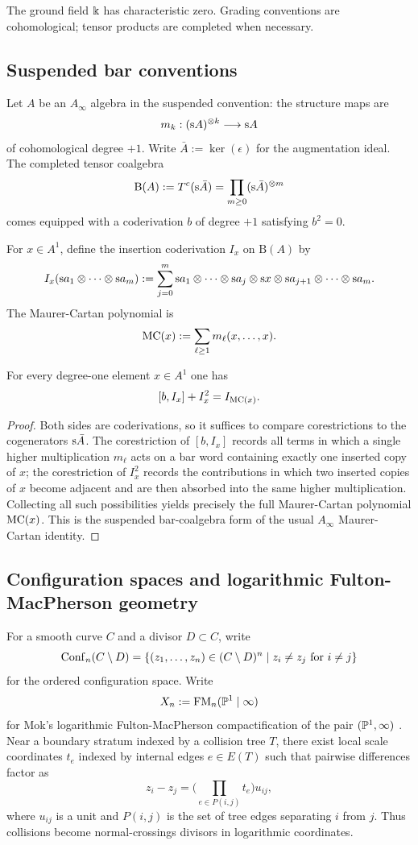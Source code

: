 The ground field $\Bbbk$ has characteristic zero. Grading conventions are cohomological; tensor products are completed when necessary.

\subsection{Suspended bar conventions}
Let $A$ be an $A_\infty$ algebra in the suspended convention: the structure maps are
\[
 m_k : (\mathrm s A)^{\otimes k} \longrightarrow \mathrm s A
\]
of cohomological degree $+1$. Write $\bar{A}:=\ker(\epsilon)$ for the augmentation ideal. The completed tensor coalgebra
\[
 \mathrm B(A):=T^c(\mathrm s \bar{A})=\prod_{m\ge 0}(\mathrm s \bar{A})^{\otimes m}
\]
comes equipped with a coderivation $b$ of degree $+1$ satisfying $b^2=0$.

For $x\in A^1$, define the insertion coderivation $I_x$ on $\mathrm B(A)$ by
\[
 I_x(\mathrm s a_1\otimes\cdots\otimes \mathrm s a_m)
 :=
 \sum_{j=0}^{m}
 \mathrm s a_1\otimes\cdots\otimes\mathrm s a_j\otimes\mathrm s x\otimes\mathrm s a_{j+1}\otimes\cdots\otimes\mathrm s a_m.
\]
The Maurer-Cartan polynomial is
\[
 \mathrm{MC}(x):=\sum_{\ell\ge 1} m_\ell(x,\dots,x).
\]

\begin{lemma}\label{lem:bar-insertion}
For every degree-one element $x\in A^1$ one has
\[
 [b,I_x]+I_x^2 = I_{\mathrm{MC}(x)}.
\]
\end{lemma}

\begin{proof}
Both sides are coderivations, so it suffices to compare corestrictions to the cogenerators $\mathrm s \bar{A}$. The corestriction of $[b,I_x]$ records all terms in which a single higher multiplication $m_\ell$ acts on a bar word containing exactly one inserted copy of $x$; the corestriction of $I_x^2$ records the contributions in which two inserted copies of $x$ become adjacent and are then absorbed into the same higher multiplication. Collecting all such possibilities yields precisely the full Maurer-Cartan polynomial $\mathrm{MC}(x)$. This is the suspended bar-coalgebra form of the usual $A_\infty$ Maurer-Cartan identity.
\end{proof}

\subsection{Configuration spaces and logarithmic Fulton-MacPherson geometry}
For a smooth curve $C$ and a divisor $D\subset C$, write
\[
 \mathrm{Conf}_n(C\setminus D)=\{(z_1,\dots,z_n)\in (C\setminus D)^n\mid z_i\neq z_j\text{ for }i\neq j\}
\]
for the ordered configuration space. Write
\[
 X_n:=\mathrm{FM}_n(\mathbb P^1\mid\infty)
\]
for Mok's logarithmic Fulton-MacPherson compactification of the pair $(\mathbb P^1,\infty)$ \cite{Mok25}. Near a boundary stratum indexed by a collision tree $T$, there exist local scale coordinates $t_e$ indexed by internal edges $e\in E(T)$ such that pairwise differences factor as
\[
 z_i-z_j = \Big(\prod_{e\in P(i,j)} t_e\Big)u_{ij},
\]
where $u_{ij}$ is a unit and $P(i,j)$ is the set of tree edges separating $i$ from $j$. Thus collisions become normal-crossings divisors in logarithmic coordinates.

